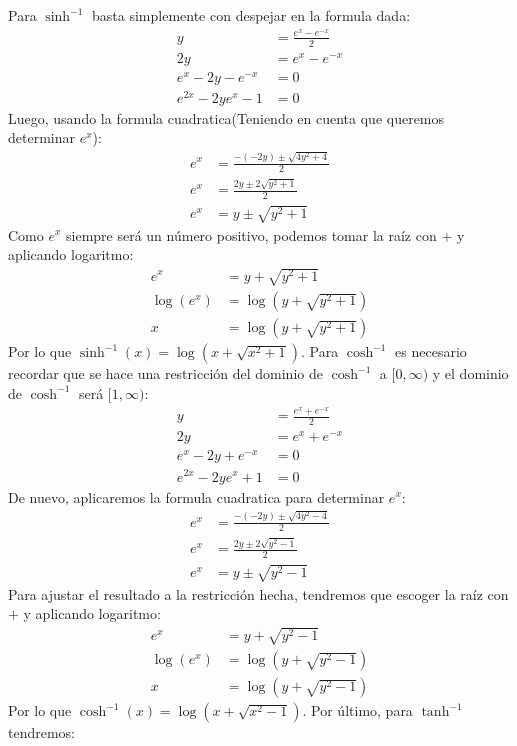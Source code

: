 \documentclass[../main.tex]{subfiles}
\begin{document}
Para $\sinh^{-1}$ basta simplemente con despejar en la formula dada:
\begin{align*}
    y &= \frac{e^{x} - e^{-x}}{2}\\
    2y &= e^{x}-e^{-x}\\
    e^{x} - 2y - e^{-x} &= 0\\
    e^{2x} - 2ye^{x} - 1 &= 0
\end{align*}
Luego, usando la formula cuadratica(Teniendo en cuenta que queremos determinar $e^x$):
\begin{align*}
    e^x &= \frac{-(-2y) \pm \sqrt{4y^2 + 4}}{2}\\
    e^x &= \frac{2y \pm 2\sqrt{y^2 + 1}}{2}\\
    e^x &= y \pm \sqrt{y^2+1}
\end{align*}
Como $e^x$ siempre será un número positivo, podemos tomar la raíz con $+$ y aplicando logaritmo:
\begin{align*}
    e^x &= y + \sqrt{y^2 + 1}\\
    \log(e^x) &= \log(y + \sqrt{y^2+1})\\
    x &= \log(y + \sqrt{y^2+1})
\end{align*}
Por lo que $\sinh^{-1}(x) = \log(x + \sqrt{x^2+1})$. Para $\cosh^{-1}$ es necesario recordar que se hace una restricción del dominio de $\cosh^{-1}$ a $[0, \infty)$ y el dominio de $\cosh^{-1}$ será $[1, \infty)$:
\begin{align*}
    y &= \frac{e^x+e^{-x}}{2}\\
    2y &= e^x+e^{-x}\\
    e^x - 2y + e^{-x} &= 0\\
    e^{2x} - 2ye^x + 1 &= 0
\end{align*}
De nuevo, aplicaremos la formula cuadratica para determinar $e^x$:
\begin{align*}
    e^x &= \frac{-(-2y) \pm \sqrt{4y^2 - 4}}{2}\\
    e^x &= \frac{2y \pm 2\sqrt{y^2-1}}{2}\\
    e^x &= y \pm \sqrt{y^2-1}
\end{align*}
Para ajustar el resultado a la restricción hecha, tendremos que escoger la raíz con $+$ y aplicando logaritmo:
\begin{align*}
    e^x &= y + \sqrt{y^2-1}\\
    \log(e^x) &= \log(y + \sqrt{y^2-1})\\
    x &= \log(y + \sqrt{y^2-1})
\end{align*}
Por lo que $\cosh^{-1}(x) = \log(x + \sqrt{x^2-1})$. Por último, para $\tanh^{-1}$ tendremos:
\end{document}
